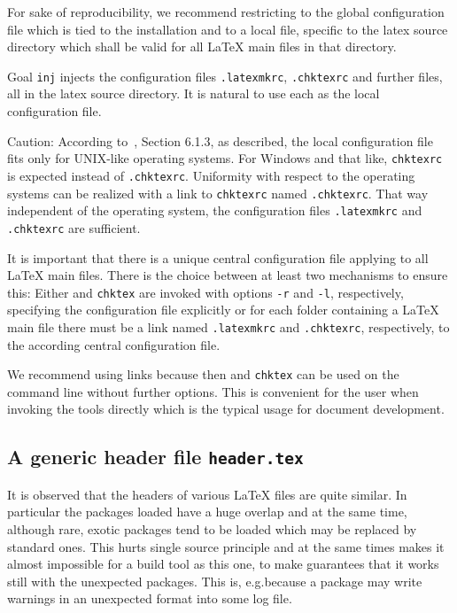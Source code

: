 For sake of reproducibility, we recommend restricting to the global configuration file 
which is tied to the installation and to a local file, specific to the latex source directory 
which shall be valid for all \LaTeX{} main files in that directory. 

Goal \texttt{inj} injects the configuration files \texttt{.latexmkrc}, \texttt{.chktexrc} 
and further files, 
all in the latex source directory. 
It is natural to use each as the local configuration file. 

Caution: According to~\cite{ChkTeX22}, Section 6.1.3, 
as described, the local configuration file fits only for UNIX-like operating systems. 
For Windows and that like, \texttt{chktexrc} is expected instead of \texttt{.chktexrc}. 
Uniformity with respect to the operating systems can be realized 
with a link to \texttt{chktexrc} named \texttt{.chktexrc}. 
That way independent of the operating system, 
the configuration files \texttt{.latexmkrc} and \texttt{.chktexrc} are sufficient. 

It is important that there is a unique central configuration file 
applying to all \LaTeX{} main files. 
There is the choice between at least two mechanisms to ensure this: 
Either  and \texttt{chktex} 
are invoked with options \texttt{-r} and \texttt{-l}, respectively, 
specifying the configuration file explicitly 
or for each folder containing a \LaTeX{} main file 
there must be a link named \texttt{.latexmkrc} and \texttt{.chktexrc}, respectively, 
to the according central configuration file. 

We recommend using links because then  and \texttt{chktex} 
can be used on the command line without further options. 
This is convenient for the user when invoking the tools directly 
which is the typical usage for document development. 


\subsection{A generic header file \texttt{header.tex}}\label{subsec:header}

It is observed that the headers of various \LaTeX{} files are quite similar. 
In particular the packages loaded 
have a huge overlap and at the same time, although rare, 
exotic packages tend to be loaded which may be replaced by standard ones. 
This hurts single source principle 
and at the same times makes it almost impossible 
for a build tool as this one, 
to make guarantees that it works still with the unexpected packages. 
This is, e.g.\@ because a package may write warnings 
in an unexpected format into some log file. 


